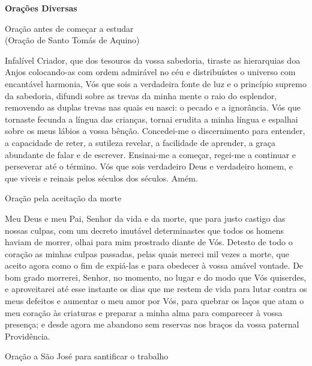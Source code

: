 \documentclass{book}
\begin{document}
\newpage
\begin{center}
    \textbf{Orações Diversas}
\end{center}
\begin{center}
    Oração antes de começar a estudar \\ \textcolor{VioletRed2}{\scriptsize{(Oração de Santo Tomás de Aquino)}}
\end{center}
\begin{flushleft}
    Infalível Criador, que dos tesouros da vossa sabedoria, tiraste as hierarquias doa Anjos colocando-as com ordem admirável no céu e distribuístes o universo com encantável harmonia, Vós que sois a verdadeira fonte de luz e o princípio supremo da sabedoria, difundi sobre as trevas da minha mente o raio do esplendor, removendo as duplas trevas nas quais eu nasci: o pecado e a ignorância. Vós que tornaste fecunda a língua das crianças, tornai erudita a minha língua e espalhai sobre os meus lábios a vossa bênção. Concedei-me o discernimento para entender, a capacidade de reter, a sutileza revelar, a facilidade de aprender, a graça abundante de falar e de escrever. Ensinai-me a começar, regei-me a continuar e perseverar até o término. Vós que sois verdadeiro Deus e verdadeiro homem, e que viveis e reinais pelos séculos dos séculos. Amém.
\end{flushleft}
\begin{center}
    Oração pela aceitação da morte
\end{center}
\begin{flushleft}
    Meu Deus e meu Pai, Senhor da vida e da morte, que para justo castigo das nossas culpas, com um decreto imutável determinastes que todos os homens haviam de morrer, olhai para mim prostrado diante de Vós. Detesto de todo o coração as minhas culpas passadas, pelas quais mereci mil vezes a morte, que aceito agora como o fim de expiá-las e para obedecer à vossa amável vontade. De bom grado morrerei, Senhor, no momento, no lugar e do modo que Vós quiserdes, e aproveitarei até esse instante os dias que me restem de vida para lutar contra os meus defeitos e aumentar o meu amor por Vós, para quebrar os laços que atam o meu coração às criaturas e preparar a minha alma para comparecer à vossa presença; e desde agora me abandono sem reservas nos braços da vossa paternal Providência.
\end{flushleft}
\newpage
\begin{center}
    Oração a São José para santificar o trabalho
\end{center}
\end{document}

